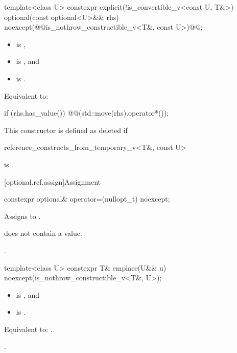 %
\begin{itemdecl}
template<class U>
  constexpr explicit(!is_convertible_v<const U, T&>)
      optional(const optional<U>&& rhs) noexcept(@@is_nothrow_constructible_v<T&, const U>)@\added{)}@;
\end{itemdecl}

\begin{itemdescr}
\pnum
\constraints
\begin{itemize}
\item {} is ,
\item {} is , and
\item {} is .
\end{itemize}

\pnum
\effects
Equivalent to:
\begin{codeblock}
if (rhs.has_value()) @@(std::move(rhs).operator*());
\end{codeblock}

\pnum
\remarks
This constructor is defined as deleted if
\begin{codeblock}
reference_constructs_from_temporary_v<T&, const U>
\end{codeblock}
is .
\end{itemdescr}

[optional.ref.assign]{Assignment}

%
\begin{itemdecl}
constexpr optional& operator=(nullopt_t) noexcept;
\end{itemdecl}

\begin{itemdescr}
\pnum
\effects
Assigns  to .

\pnum
\ensures
{} does not contain a value.

\pnum
\returns
{}.
\end{itemdescr}

%
\begin{itemdecl}
template<class U>
  constexpr T& emplace(U&& u) noexcept(is_nothrow_constructible_v<T&, U>);
\end{itemdecl}

\begin{itemdescr}
\pnum
\constraints
\begin{itemize}
\item {} is , and
\item {} is .
\end{itemize}

\pnum
\effects
Equivalent to: .

\pnum
\returns
{}.
\end{itemdescr}

